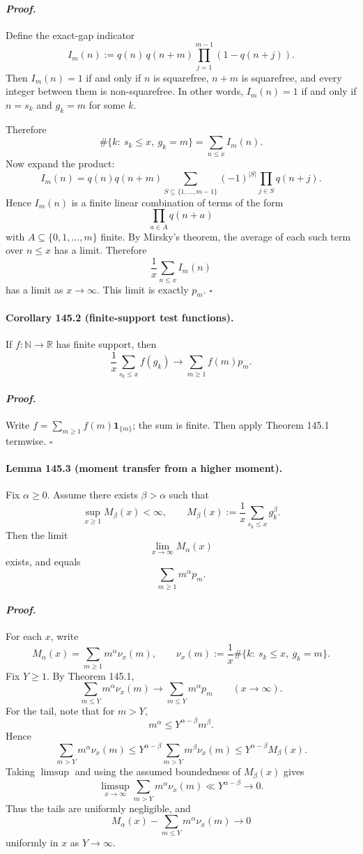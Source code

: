 \paragraph{\textit{Proof.}}
Define the exact-gap indicator
\[
I_m(n):=q(n)\,q(n+m)\prod_{j=1}^{m-1}(1-q(n+j)).
\]
Then $I_m(n)=1$ if and only if $n$ is squarefree, $n+m$ is squarefree, and every integer
between them is non-squarefree. In other words, $I_m(n)=1$ if and only if $n=s_k$ and
$g_k=m$ for some $k$.

Therefore
\[
\#\{k:\ s_k\le x,\ g_k=m\}=\sum_{n\le x} I_m(n).
\]
Now expand the product:
\[
I_m(n)=
q(n)q(n+m)\sum_{S\subseteq \{1,\dots,m-1\}} (-1)^{|S|}\prod_{j\in S} q(n+j).
\]
Hence $I_m(n)$ is a finite linear combination of terms of the form
\[
\prod_{a\in A} q(n+a)
\]
with $A\subseteq \{0,1,\dots,m\}$ finite. By Mirsky's theorem, the average of each such term
over $n\le x$ has a limit. Therefore
\[
\frac1x\sum_{n\le x} I_m(n)
\]
has a limit as $x\to\infty$. This limit is exactly $p_m$. \hfill $\square$

\paragraph{\textbf{Corollary 145.2 (finite-support test functions).}}
If $f:\mathbb N\to \mathbb R$ has finite support, then
\[
\frac1x\sum_{s_k\le x} f(g_k)\to \sum_{m\ge 1} f(m)p_m.
\]

\paragraph{\textit{Proof.}}
Write $f=\sum_{m\ge 1} f(m)\mathbf 1_{\{m\}}$; the sum is finite. Then apply Theorem 145.1 termwise.
\hfill $\square$

\paragraph{\textbf{Lemma 145.3 (moment transfer from a higher moment).}}
Fix $\alpha\ge 0$. Assume there exists $\beta>\alpha$ such that
\[
\sup_{x\ge 1} M_\beta(x)<\infty,
\qquad
M_\beta(x):=\frac1x\sum_{s_k\le x} g_k^\beta.
\]
Then the limit
\[
\lim_{x\to\infty} M_\alpha(x)
\]
exists, and equals
\[
\sum_{m\ge 1} m^\alpha p_m.
\]

\paragraph{\textit{Proof.}}
For each $x$, write
\[
M_\alpha(x)=\sum_{m\ge 1} m^\alpha \nu_x(m),
\qquad
\nu_x(m):=\frac1x\#\{k:\ s_k\le x,\ g_k=m\}.
\]
Fix $Y\ge 1$. By Theorem 145.1,
\[
\sum_{m\le Y} m^\alpha \nu_x(m)\to \sum_{m\le Y} m^\alpha p_m
\qquad (x\to\infty).
\]
For the tail, note that for $m>Y$,
\[
m^\alpha \le Y^{\alpha-\beta}m^\beta.
\]
Hence
\[
\sum_{m>Y} m^\alpha \nu_x(m)
\le
Y^{\alpha-\beta}\sum_{m>Y} m^\beta \nu_x(m)
\le
Y^{\alpha-\beta} M_\beta(x).
\]
Taking $\limsup$ and using the assumed boundedness of $M_\beta(x)$ gives
\[
\limsup_{x\to\infty}\sum_{m>Y} m^\alpha \nu_x(m)\ll Y^{\alpha-\beta}\to 0.
\]
Thus the tails are uniformly negligible, and
\[
M_\alpha(x)-\sum_{m\le Y} m^\alpha \nu_x(m)\to 0
\]
uniformly in $x$ as $Y\to\infty$.

